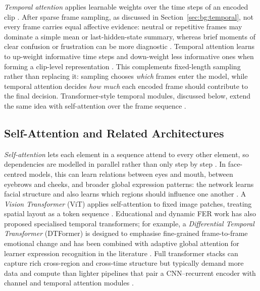\emph{Temporal attention} applies learnable weights over the time steps of an encoded clip \cite{mehta_three-dimensional_2022,su_leveraging_2024}. After sparse frame sampling, as discussed in Section~\ref{sec:bg:temporal}, not every frame carries equal affective evidence: neutral or repetitive frames may dominate a simple mean or last-hidden-state summary, whereas brief moments of clear confusion or frustration can be more diagnostic \cite{liu_dynamic_nodate,abedi_improving_2021}. Temporal attention learns to up-weight informative time steps and down-weight less informative ones when forming a clip-level representation \cite{mehta_three-dimensional_2022,tulsani_realtime_2025}. This complements fixed-length sampling rather than replacing it: sampling chooses \emph{which} frames enter the model, while temporal attention decides \emph{how much} each encoded frame should contribute to the final decision. Transformer-style temporal modules, discussed below, extend the same idea with self-attention over the frame sequence \cite{su_leveraging_2024,liu_dynamic_nodate}.

\subsection{Self-Attention and Related Architectures}\label{sec:bg:self_attention}

\emph{Self-attention} lets each element in a sequence attend to every other element, so dependencies are modelled in parallel rather than only step by step \cite{vaswani_attention_2017,su_leveraging_2024}. In face-centred models, this can learn relations between eyes and mouth, between eyebrows and cheeks, and broader global expression patterns: the network learns facial structure and also learns which regions should influence one another \cite{su_leveraging_2024,liu_dynamic_nodate}. A \emph{Vision Transformer} (ViT) applies self-attention to fixed image patches, treating spatial layout as a token sequence \cite{tulsani_realtime_2025,su_leveraging_2024}. Educational and dynamic FER work has also proposed specialised temporal transformers; for example, a \emph{Differential Temporal Transformer} (DTFormer) is designed to emphasise fine-grained frame-to-frame emotional change and has been combined with adaptive global attention for learner expression recognition in the literature \cite{liu_dynamic_nodate}. Full transformer stacks can capture rich cross-region and cross-time structure but typically demand more data and compute than lighter pipelines that pair a CNN--recurrent encoder with channel and temporal attention modules \cite{lek_academic_2023,su_leveraging_2024,aly_revolutionizing_2025}.

